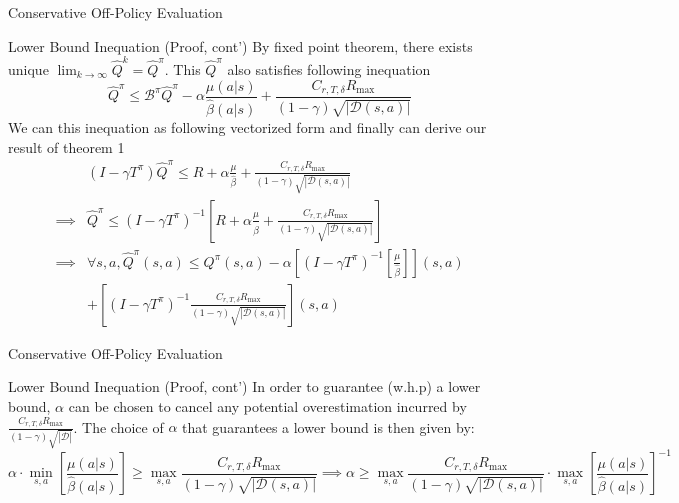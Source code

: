 \documentclass[11pt]{beamer}
\newcommand{\mc}[1]{\mathcal{#1}}
\newcommand{\abs}[1]{\left\lvert #1 \right\rvert}
\begin{document}
\begin{frame}{Conservative Off-Policy Evaluation}
  \begin{block}{Lower Bound Inequation (Proof, cont')}
    By fixed point theorem, there exists unique $\lim_{k \to \infty}\hat{Q}^{k} = \hat{Q}^\pi$.
    This $\hat{Q}^\pi$ also satisfies following inequation
    \[
      \hat{Q}^\pi \leq \mc{B}^\pi \hat{Q}^\pi - \alpha \frac{\mu(a|s)}{\hat{\beta}(a|s)} + \frac{C_{r,T,\delta}R_{\text{max}}}{(1-\gamma) \sqrt{\abs{\mc{D}(s,a)}}}
    \]
    We can this inequation as following vectorized form and finally can derive our result of theorem 1
    \[
      \begin{aligned}
        &(I - \gamma T^\pi) \hat{Q}^\pi \leq R + \alpha \frac{\mu}{\hat{\beta}} +\frac{C_{r,T,\delta}R_{\text{max}}}{(1-\gamma) \sqrt{\abs{\mc{D}(s,a)}}} \\
        \implies&\hat{Q}^\pi \leq (I - \gamma T^\pi)^{-1} \left[ R + \alpha \frac{\mu}{\hat{\beta}} + \frac{C_{r,T,\delta}R_{\text{max}}}{(1-\gamma) \sqrt{\abs{\mc{D}(s,a)}}}\right] \\
        \implies &\forall s,a, \hat{Q}^\pi(s,a) \leq Q^\pi (s,a) - \alpha \left[ (I - \gamma T^\pi)^{-1}\left[\frac{\mu}{\hat{\beta}}\right]\right](s,a) \\
        &+ \left[(I - \gamma T^\pi)^{-1} \frac{C_{r,T,\delta}R_{\text{max}}}{(1-\gamma) \sqrt{\abs{\mc{D}(s,a)}}}\right] (s,a)
      \end{aligned}
    \]
  \end{block}
\end{frame}

\begin{frame}{Conservative Off-Policy Evaluation}
  \begin{block}{Lower Bound Inequation (Proof, cont')}
    In order to guarantee (w.h.p) a lower bound, $\alpha$ can be chosen to cancel any potential \hypertarget{text:why_only_consider_overestimation}{overestimation incurred} by $\frac{C_{r,T,\delta}R_{\text{max}}}{(1-\gamma) \sqrt{\abs{\mc{D}}}}$.
    The choice of $\alpha$ that guarantees a lower bound is then given by:
    \[
      \alpha \cdot \min_{s,a} \left[\frac{\mu(a|s)}{\hat{\beta}(a|s)}\right]  \geq \max_{s,a} \frac{C_{r,T, \delta} R_{\text{max}}}{ (1-\gamma) \sqrt{\abs{\mc{D}(s,a)}}} \implies \alpha \geq \max_{s,a} \frac{C_{r,T,\delta} R_{\text{max}}}{(1-\gamma) \sqrt{\abs{\mc{D}(s,a)}}} \cdot \max_{s,a} \left[\frac{\mu(a|s)}{\hat{\beta}(a|s)}\right]^{-1}
    \]
  \end{block}
\end{frame}
\end{document}

